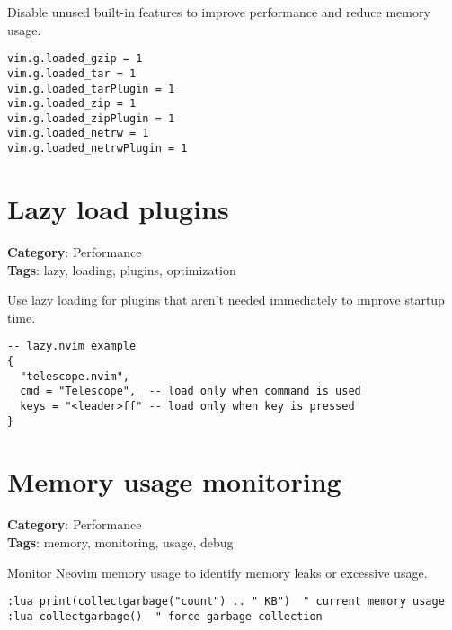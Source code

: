 {{{{{{{{{{Disable unused built-in features to improve performance and reduce memory usage.

\begin{Exa*}{}
\begin{Verbatim}[fontsize=\footnotesize, breaklines, breakanywhere]
vim.g.loaded_gzip = 1
vim.g.loaded_tar = 1
vim.g.loaded_tarPlugin = 1
vim.g.loaded_zip = 1
vim.g.loaded_zipPlugin = 1
vim.g.loaded_netrw = 1
vim.g.loaded_netrwPlugin = 1
\end{Verbatim}
\end{Exa*}

\section{Lazy load plugins}

\textbf{Category}: Performance\\ \textbf{Tags}: lazy, loading, plugins, optimization
\vspace{0.5cm}

Use lazy loading for plugins that aren't needed immediately to improve startup time.

\begin{Exa*}{}
\begin{Verbatim}[fontsize=\footnotesize, breaklines, breakanywhere]
-- lazy.nvim example
{
  "telescope.nvim",
  cmd = "Telescope",  -- load only when command is used
  keys = "<leader>ff" -- load only when key is pressed
}
\end{Verbatim}
\end{Exa*}

\section{Memory usage monitoring}

\textbf{Category}: Performance\\ \textbf{Tags}: memory, monitoring, usage, debug
\vspace{0.5cm}

Monitor Neovim memory usage to identify memory leaks or excessive usage.

\begin{Exa*}{}
\begin{Verbatim}[fontsize=\footnotesize, breaklines, breakanywhere]
:lua print(collectgarbage("count") .. " KB")  " current memory usage
:lua collectgarbage()  " force garbage collection
\end{Verbatim}
\end{Exa*}

}}}}}}}}}}
